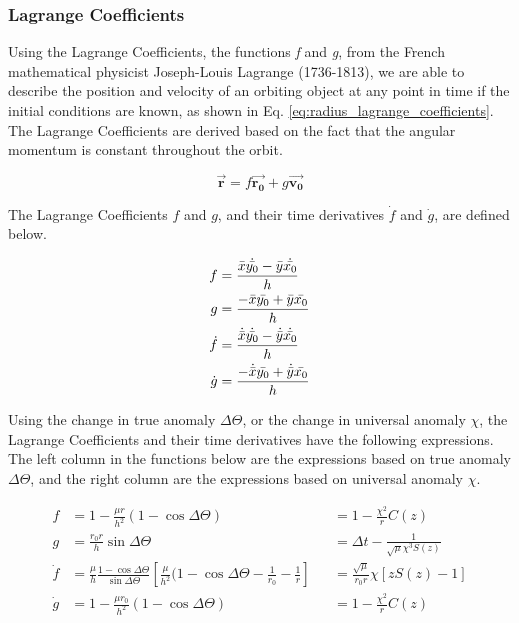 \subsubsection{Lagrange Coefficients}

Using the Lagrange Coefficients, the functions \textit{f} and \textit{g}, from the French mathematical physicist Joseph-Louis Lagrange (1736-1813), we are able to describe the position and velocity of an orbiting object at any point in time if the initial conditions are known, as shown in Eq. \ref{eq:radius_lagrange_coefficients}. The Lagrange Coefficients are derived based on the fact that the angular momentum is constant throughout the orbit.   


\begin{equation}
    \Vec{\mathbf{r}} = f \Vec{\mathbf{r_0}} + g \Vec{\mathbf{v_0}}
    \label{eq:radius_lagrange_coefficients}
\end{equation}

The Lagrange Coefficients $f$ and $g$, and their time derivatives $\dot{f}$ and $\dot{g}$, are defined below.

\begin{align}
    f &= \frac{ \Bar{x} \dot{\Bar{y_0}} - \Bar{y} \dot{\Bar{x_0}} }{ h }
    \label{eq:lagrange_f} \\
    g &= \frac{ - \Bar{x} \Bar{y_0} + \Bar{y} \Bar{x_0} }{ h } 
    \label{eq:lagrange_g} \\
    \dot{f} &= \frac{ \dot{\Bar{x}} \dot{\Bar{y_0}} - \dot{\Bar{y}} \dot{\Bar{x_0}} }{ h } 
    \label{eq:lagrange_f_dot} \\
    \dot{g} &= \frac{ - \dot{\Bar{x}} \Bar{y_0} + \dot{\Bar{y}} \Bar{x_0} }{ h } 
    \label{eq:lagrange_g_dot}
\end{align}

Using the change in true anomaly $\Delta \Theta$, or the change in universal anomaly $\chi$, the Lagrange Coefficients and their time derivatives have the following expressions. The left column in the functions below are the expressions based on true anomaly $\Delta \Theta$, and the right column are the expressions based on universal anomaly $\chi$.

\begin{align}
    f &= 1 - \frac{ \mu r }{ h^2 } ( 1 - \cos{\Delta \Theta} ) &&= 1 - \frac{\chi^2}{r} C(z)
    \label{eq:lagrange_anomaly_f} \\
    g  &= \frac{ r_0 r }{ h } \sin{\Delta \Theta} &&= \Delta t - \frac{1}{\sqrt{\mu} \chi^3 S( z )}
    \label{eq:lagrange_anomaly_g} \\
    \dot{f} &= \frac{\mu}{h} \frac{1 - \cos{\Delta \Theta}}{\sin{\Delta \Theta}} [ \frac{\mu}{h^2} (1 - \cos{\Delta \Theta} - \frac{1}{r_0} - \frac{1}{r} ] &&= \frac{\sqrt{\mu}}{r_0 r} \chi [z S(z) - 1]
    \label{eq:lagrange_anomaly_f_dot} \\
    \dot{g} &= 1 - \frac{\mu r_0}{h^2} (1 - \cos{\Delta \Theta} ) &&= 1 - \frac{\chi^2}{r} C(z)
    \label{eq:lagrange_anomaly_g_dot}
\end{align}

